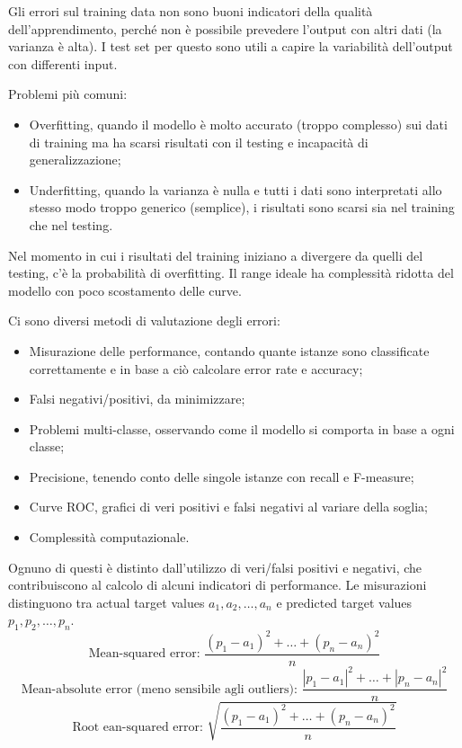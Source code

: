 Gli errori sul training data non sono buoni indicatori della qualità dell'apprendimento, perché non è possibile prevedere l'output con altri dati (la varianza è alta). I test set per questo sono utili a capire la variabilità dell'output con differenti input.

Problemi più comuni:
\begin{itemize}
	\item Overfitting, quando il modello è molto accurato (troppo complesso) sui dati di training ma ha scarsi risultati con il testing e incapacità di generalizzazione;
	\item Underfitting, quando la varianza è nulla e tutti i dati sono interpretati allo stesso modo troppo generico (semplice), i risultati sono scarsi sia nel training che nel testing.
\end{itemize}

Nel momento in cui i risultati del training iniziano a divergere da quelli del testing, c'è la probabilità di overfitting. Il range ideale ha complessità ridotta del modello con poco scostamento delle curve.

Ci sono diversi metodi di valutazione degli errori:
\begin{itemize}
	\item Misurazione delle performance, contando quante istanze sono classificate correttamente e in base a ciò calcolare error rate e accuracy;
	\item Falsi negativi/positivi, da minimizzare;
	\item Problemi multi-classe, osservando come il modello si comporta in base a ogni classe;
	\item Precisione, tenendo conto delle singole istanze con recall e 
	F-measure;
	\item Curve ROC, grafici di veri positivi e falsi negativi al variare della soglia;
	\item Complessità computazionale.
\end{itemize}

Ognuno di questi è distinto dall'utilizzo di veri/falsi positivi e negativi, che contribuiscono al calcolo di alcuni indicatori di performance. Le misurazioni distinguono tra actual target values $a_1, a_2, \dots, a_n$ e predicted target values $p_1, p_2, \dots, p_n$.
$$\text{Mean-squared error: } \frac{(p_1 - a_1)^2 + \dots + (p_n - a_n)^2}{n}$$
$$\text{Mean-absolute error (meno sensibile agli outliers): } \frac{|p_1 - a_1|^2 + \dots + |p_n - a_n|^2}{n}$$
$$\text{Root ean-squared error: } \sqrt{\frac{(p_1 - a_1)^2 + \dots + (p_n - a_n)^2}{n}}$$

